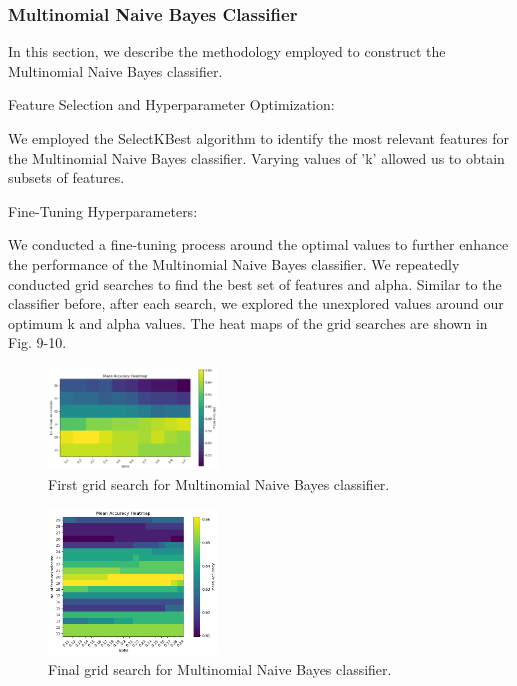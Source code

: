 \documentclass[journal,comsoc]{IEEEtran}
\begin{document}
\subsubsection{Multinomial Naive Bayes Classifier}
In this section, we describe the methodology employed to construct the Multinomial Naive Bayes classifier.

Feature Selection and Hyperparameter Optimization:

We employed the SelectKBest algorithm to identify the most relevant features for the Multinomial Naive Bayes classifier. Varying values of 'k' allowed us to obtain subsets of features.

Fine-Tuning Hyperparameters:

We conducted a fine-tuning process around the optimal values to further enhance the performance of the Multinomial Naive Bayes classifier. We repeatedly conducted grid searches to find the best set of features and alpha. Similar to the classifier before, after each search, we explored the unexplored values around our optimum k and alpha values. The heat maps of the grid searches are shown in Fig. 9-10.

\begin{figure}[H]
  \centering
  \includegraphics[width=0.4\textwidth]{nb1.png}
  \caption{ First grid search for Multinomial Naive Bayes classifier.}
  \label{fig:nb1}
\end{figure}

\begin{figure}[H]
  \centering
  \includegraphics[width=0.4\textwidth]{nb2.png}
  \caption{Final grid search for Multinomial Naive Bayes classifier.}
  \label{fig:nb2}
\end{figure}
\end{document}
